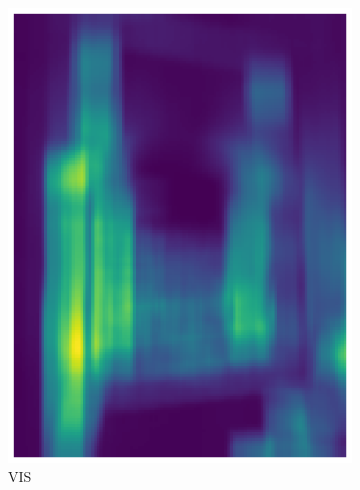 \documentclass{l4proj}
\begin{document}
\begin{figure}[ht]
  \centering
  \begin{subfigure}[h!]{0.25\textwidth}
    \includegraphics[width=\textwidth]{images/registration/filtered_le_rgb.png}
    \caption{VIS}
  \end{subfigure}
  \begin{subfigure}[h!]{0.25\textwidth}

\end{subfigure}
\end{figure}
\end{document}
